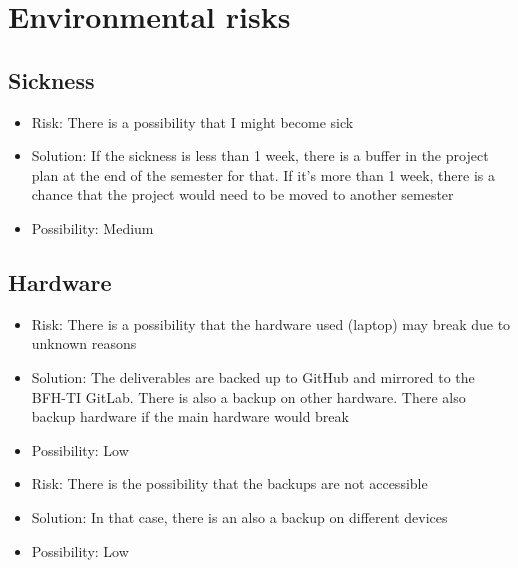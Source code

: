 \documentclass[
	a4paper               %
	,BCOR=0mm            %
	,bibliography=totoc   %
	,listof=totoc         %
	,monolingual
	,twoside=false
]{bfhthesis}              %
\begin{document}
\section{Environmental risks}

\subsection{Sickness}
\begin{itemize}
	\item Risk: There is a possibility that I might become sick
	\item Solution: If the sickness is less than 1 week, there is a buffer in the project plan at the end of the semester for that. If it's more than 1 week, there is a chance that the project would need to be moved to another semester
	\item Possibility: Medium
\end{itemize}

\subsection{Hardware}
\begin{itemize}
	\item Risk: There is a possibility that the hardware used (laptop) may break due to unknown reasons
	\item Solution: The deliverables are backed up to GitHub and mirrored to the BFH-TI GitLab. There is also a backup on other hardware. There also backup hardware if the main hardware would break
	\item Possibility: Low
\end{itemize}
\begin{itemize}
	\item Risk: There is the possibility that the backups are not accessible
	\item Solution: In that case, there is an also a backup on different devices
	\item Possibility: Low
\end{itemize}
\end{document}
